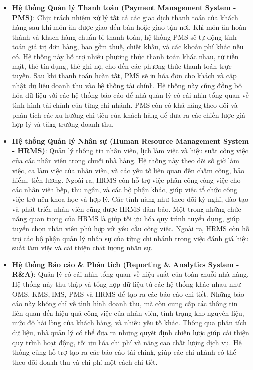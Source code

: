 \begin{itemize}
    \item \textbf{Hệ thống Quản lý Thanh toán (Payment Management System - PMS)}: Chịu trách nhiệm xử lý tất cả các giao dịch thanh toán của khách hàng sau khi món ăn được giao đến bàn hoặc giao tận nơi. Khi món ăn hoàn thành và khách hàng chuẩn bị thanh toán, hệ thống PMS sẽ tự động tính toán giá trị đơn hàng, bao gồm thuế, chiết khấu, và các khoản phí khác nếu có. Hệ thống này hỗ trợ nhiều phương thức thanh toán khác nhau, từ tiền mặt, thẻ tín dụng, thẻ ghi nợ, cho đến các phương thức thanh toán trực tuyến. Sau khi thanh toán hoàn tất, PMS sẽ in hóa đơn cho khách và cập nhật dữ liệu doanh thu vào hệ thống tài chính. Hệ thống này cũng đồng bộ hóa dữ liệu với các hệ thống báo cáo để nhà quản lý có cái nhìn tổng quan về tình hình tài chính của từng chi nhánh. PMS còn có khả năng theo dõi và phân tích các xu hướng chi tiêu của khách hàng để đưa ra các chiến lược giá hợp lý và tăng trưởng doanh thu.

    \item \textbf{Hệ thống Quản lý Nhân sự (Human Resource Management System - HRMS)}: Quản lý thông tin nhân viên, lịch làm việc và hiệu suất công việc của các nhân viên trong chuỗi nhà hàng. Hệ thống này theo dõi số giờ làm việc, ca làm việc của nhân viên, và các yếu tố liên quan đến chấm công, bảo hiểm, tiền lương. Ngoài ra, HRMS còn hỗ trợ việc phân công công việc cho các nhân viên bếp, thu ngân, và các bộ phận khác, giúp việc tổ chức công việc trở nên khoa học và hợp lý. Các tính năng như theo dõi kỳ nghỉ, đào tạo và phát triển nhân viên cũng được HRMS đảm bảo. Một trong những chức năng quan trọng của HRMS là giúp tối ưu hóa quy trình tuyển dụng, giúp tuyển chọn nhân viên phù hợp với yêu cầu công việc. Ngoài ra, HRMS còn hỗ trợ các bộ phận quản lý nhân sự của từng chi nhánh trong việc đánh giá hiệu suất làm việc và cải thiện chất lượng nhân sự.

    \item \textbf{Hệ thống Báo cáo \& Phân tích (Reporting \& Analytics System - R\&A)}: Quản lý có cái nhìn tổng quan về hiệu suất của toàn chuỗi nhà hàng. Hệ thống này thu thập và tổng hợp dữ liệu từ các hệ thống khác nhau như OMS, KMS, IMS, PMS và HRMS để tạo ra các báo cáo chi tiết. Những báo cáo này không chỉ về tình hình doanh thu, mà còn cung cấp các thông tin liên quan đến hiệu quả công việc của nhân viên, tình trạng kho nguyên liệu, mức độ hài lòng của khách hàng, và nhiều yếu tố khác. Thông qua phân tích dữ liệu, nhà quản lý có thể đưa ra những quyết định chiến lược giúp cải thiện quy trình hoạt động, tối ưu hóa chi phí và nâng cao chất lượng dịch vụ. Hệ thống cũng hỗ trợ tạo ra các báo cáo tài chính, giúp các chi nhánh có thể theo dõi doanh thu và chi phí một cách chi tiết.


\end{itemize}

